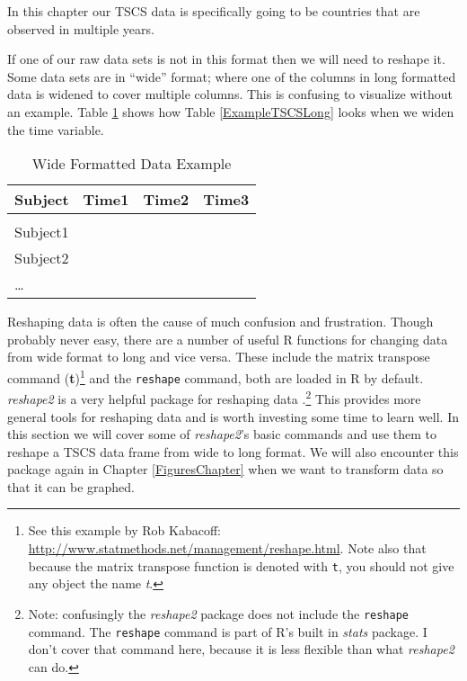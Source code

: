 \noindent In this chapter our TSCS data is specifically going to be countries that are observed in multiple years.

If one of our raw data sets is not in this format then we will need to reshape it. Some data sets are in ``wide'' format; where one of the columns in long formatted data is widened to cover multiple columns. This is confusing to visualize without an example. Table \ref{ExampleWide} shows how Table \ref{ExampleTSCSLong} looks when we widen the time variable.

\begin{table}[h!]
    \caption{Wide Formatted Data Example}
    \label{ExampleWide}
    \begin{tabular}{l c c c}
        \\[0.15cm]
        \hline 
        Subject & Time1 & Time2 & Time3 \\
        \hline \\[0.1cm]
        Subject1 & & & \\[0.25cm]
        Subject2 & & & \\[0.25cm]
        \ldots & & & \\[0.25cm]
        \hline
    \end{tabular}
\end{table}

Reshaping data is often the cause of much confusion and frustration. Though probably never easy, there are a number of useful R functions for changing data from wide format to long and vice versa. These include the matrix transpose command (\textbf{t})\footnote{See this example by Rob Kabacoff: \url{http://www.statmethods.net/management/reshape.html}. Note also that because the matrix transpose function is denoted with \texttt{t}, you should not give any object the name \emph{t}.} and the \texttt{reshape} command, both are loaded in R by default. \emph{reshape2} is a very helpful package for reshaping data \citep{R-reshape2}.\footnote{Note: confusingly the \emph{reshape2} package does not include the \texttt{reshape} command. The \texttt{reshape} command is part of R's built in \emph{stats} package. I don't cover that command here, because it is less flexible than what \emph{reshape2} can do.} This provides more general tools for reshaping data and is worth investing some time to learn well. In this section we will cover some of \emph{reshape2}'s basic commands and use them to reshape a TSCS data frame from wide to long format. We will also encounter this package again in Chapter \ref{FiguresChapter} when we want to transform data so that it can be graphed.

